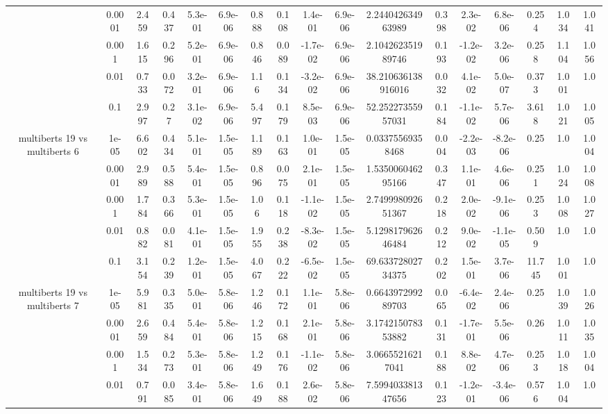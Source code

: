 \begin{tabular}{|c|c|c|c|c|c|c|c|c|c|c|c|c|c|c|c|c|}
 & 0.0001 & 2.459 & 0.437 & 5.3e-01 & 6.9e-06 & 0.888 & 0.108 & 1.4e-01 & 6.9e-06 & 2.244042634963989 & 0.398 & 2.3e-02 & 6.8e-06 & 0.254 & 1.034 & 1.041 \\
 & 0.001 & 1.615 & 0.296 & 5.2e-01 & 6.9e-06 & 0.846 & 0.089 & -1.7e-02 & 6.9e-06 & 2.104262351989746 & 0.193 & -1.2e-02 & 3.2e-06 & 0.258 & 1.104 & 1.056 \\
 & 0.01 & 0.733 & 0.072 & 3.2e-01 & 6.9e-06 & 1.16 & 0.134 & -3.2e-02 & 6.9e-06 & 38.210636138916016 & 0.032 & 4.1e-02 & 5.0e-07 & 0.373 & 1.001 & 1.0 \\
 & 0.1 & 2.997 & 0.27 & 3.1e-02 & 6.9e-06 & 5.497 & 0.179 & 8.5e-03 & 6.9e-06 & 52.25227355957031 & 0.184 & -1.1e-02 & 5.7e-06 & 3.618 & 1.021 & 1.005 \\
\hline
\multirow{5}{*}{multiberts 19 vs multiberts 6} & 1e-05 & 6.602 & 0.434 & 5.1e-01 & 1.5e-05 & 1.189 & 0.163 & 1.0e-01 & 1.5e-05 & 0.03375569358468 & 0.004 & -2.2e-03 & -8.2e-06 & 0.25 & 1.0 & 1.004 \\
 & 0.0001 & 2.989 & 0.588 & 5.4e-01 & 1.5e-05 & 0.896 & 0.075 & 2.1e-01 & 1.5e-05 & 1.535006046295166 & 0.347 & 1.1e-01 & 4.6e-06 & 0.251 & 1.024 & 1.008 \\
 & 0.001 & 1.784 & 0.366 & 5.3e-01 & 1.5e-05 & 1.06 & 0.118 & -1.1e-02 & 1.5e-05 & 2.749998092651367 & 0.218 & 2.0e-02 & -9.1e-06 & 0.253 & 1.008 & 1.027 \\
 & 0.01 & 0.882 & 0.081 & 4.1e-01 & 1.5e-05 & 1.955 & 0.238 & -8.3e-02 & 1.5e-05 & 5.129817962646484 & 0.212 & 9.0e-02 & -1.1e-05 & 0.509 & 1.0 & 1.0 \\
 & 0.1 & 3.154 & 0.239 & 1.2e-01 & 1.5e-05 & 4.067 & 0.222 & -6.5e-02 & 1.5e-05 & 69.63372802734375 & 0.202 & 1.5e-01 & 3.7e-06 & 11.745 & 1.001 & 1.0 \\
\hline
\multirow{5}{*}{multiberts 19 vs multiberts 7} & 1e-05 & 5.981 & 0.335 & 5.0e-01 & 5.8e-06 & 1.246 & 0.172 & 1.1e-01 & 5.8e-06 & 0.664397299289703 & 0.065 & -6.4e-02 & 2.4e-06 & 0.25 & 1.039 & 1.026 \\
 & 0.0001 & 2.659 & 0.484 & 5.4e-01 & 5.8e-06 & 1.215 & 0.168 & 2.1e-01 & 5.8e-06 & 3.174215078353882 & 0.131 & -1.7e-01 & 5.5e-06 & 0.26 & 1.011 & 1.035 \\
 & 0.001 & 1.534 & 0.273 & 5.3e-01 & 5.8e-06 & 1.249 & 0.176 & -1.1e-02 & 5.8e-06 & 3.06655216217041 & 0.188 & 8.8e-02 & 4.7e-06 & 0.253 & 1.018 & 1.004 \\
 & 0.01 & 0.791 & 0.085 & 3.4e-01 & 5.8e-06 & 1.649 & 0.188 & 2.6e-02 & 5.8e-06 & 7.599403381347656 & 0.123 & -1.2e-01 & -3.4e-06 & 0.576 & 1.004 & 1.0 \\

\end{tabular}
